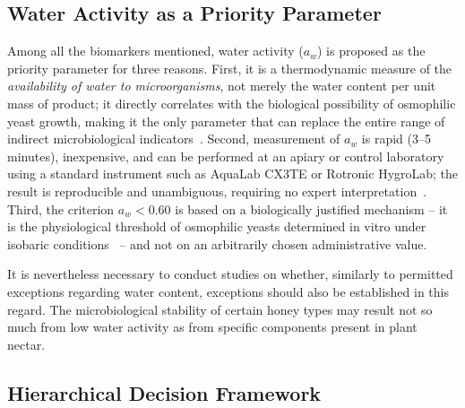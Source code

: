 

\subsection{Water Activity as a Priority Parameter}

Among all the biomarkers mentioned, water activity
($a_w$) is proposed as the priority parameter for three reasons.
First, it is a thermodynamic measure of the \emph{availability
of water to microorganisms}, not merely the water content per unit
mass of product; it directly correlates with the biological
possibility of osmophilic yeast growth, making it the only
parameter that can replace the entire range of indirect
microbiological indicators~\cite{ruegg1981,waaw2006}.
Second, measurement of $a_w$ is rapid (3--5 minutes), inexpensive,
and can be performed at an apiary or control laboratory using a
standard instrument such as AquaLab CX3TE or Rotronic HygroLab;
the result is reproducible and unambiguous, requiring no expert
interpretation~\cite{zamora2006}.
Third, the criterion $a_w < 0.60$ is based on a biologically
justified mechanism -- it is the physiological threshold of
osmophilic yeasts determined in vitro under isobaric
conditions~\cite{waaw2006,ruegg1981} -- and not on an arbitrarily
chosen administrative value.

It is nevertheless necessary to conduct studies on whether,
similarly to permitted exceptions regarding water content, exceptions
should also be established in this regard. The microbiological
stability of certain honey types may result not so much from low
water activity as from specific components present in plant nectar.

\subsection{Hierarchical Decision Framework}

